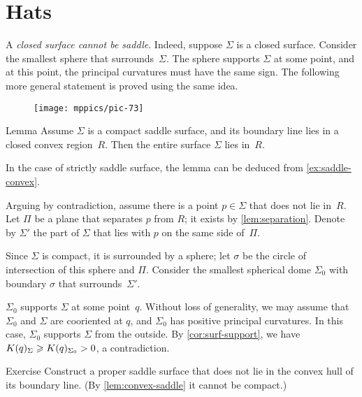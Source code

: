 \section{Hats}

A \textit{closed surface cannot be saddle}.
Indeed, suppose $\Sigma$ is a closed surface.
Consider the smallest sphere that surrounds~$\Sigma$.
The sphere supports $\Sigma$ at some point, and at this point, the principal curvatures must have the same sign.
The following more general statement is proved using the same idea.

{

\begin{wrapfigure}[6]{r}{45 mm}
\vskip-6mm
\centering
\texttt{[image: mppics/pic-73]}
\vskip0mm
\end{wrapfigure}

\begin{thm}{Lemma}\label{lem:convex-saddle}
Assume $\Sigma$ is a compact saddle surface, and its boundary line lies in a closed convex  region~$R$.
Then the entire surface $\Sigma$ lies in~$R$.
\end{thm}

In the case of strictly saddle surface, the lemma can be deduced from \ref{ex:saddle-convex}.

Arguing by contradiction,
assume there is a point $p\in \Sigma$ that does not lie in~$R$.
Let $\Pi$ be a plane that separates $p$ from $R$; it exists by \ref{lem:separation}.
Denote by $\Sigma'$ the part of $\Sigma$ that lies with $p$ on the same side of~$\Pi$.

}

Since $\Sigma$ is compact, it is surrounded by a sphere;
let $\sigma$ be the circle of intersection of this sphere and $\Pi$.
Consider the smallest spherical dome $\Sigma_0$ with boundary $\sigma$ that surrounds~$\Sigma'$.

$\Sigma_0$ supports $\Sigma$ at some point~$q$.
Without loss of generality, we may assume that $\Sigma_0$ and $\Sigma$ are cooriented at $q$, and $\Sigma_0$ has positive principal curvatures.
In this case, $\Sigma_0$ supports $\Sigma$ from the outside.
By \ref{cor:surf-support}, we have $K(q)_\Sigma\z\ge K(q)_{\Sigma_0}>0$, a contradiction.
\qeds

\begin{thm}{Exercise}\label{ex:proper-saddle}
Construct a proper saddle surface that does not lie in the convex hull of its boundary line.
(By \ref{lem:convex-saddle} it cannot be compact.)
\end{thm}


